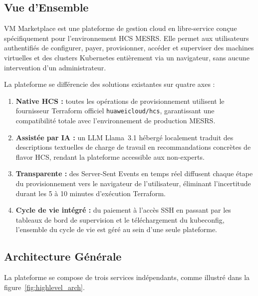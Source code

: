 \subsection{Vue d'Ensemble}

VM Marketplace est une plateforme de gestion cloud en libre-service conçue
spécifiquement pour l'environnement HCS MESRS. Elle permet aux utilisateurs
authentifiés de configurer, payer, provisionner, accéder et superviser des machines
virtuelles et des clusters Kubernetes entièrement via un navigateur, sans aucune
intervention d'un administrateur.

La plateforme se différencie des solutions existantes sur quatre axes :
\begin{enumerate}
  \item \textbf{Native HCS :} toutes les opérations de provisionnement utilisent le
        fournisseur Terraform officiel \texttt{huaweicloud/hcs}, garantissant une
        compatibilité totale avec l'environnement de production MESRS.
  \item \textbf{Assistée par IA :} un LLM Llama~3.1 hébergé localement traduit des
        descriptions textuelles de charge de travail en recommandations concrètes de
        flavor HCS, rendant la plateforme accessible aux non-experts.
  \item \textbf{Transparente :} des Server-Sent Events en temps réel diffusent chaque
        étape du provisionnement vers le navigateur de l'utilisateur, éliminant
        l'incertitude durant les 5 à 10 minutes d'exécution Terraform.
  \item \textbf{Cycle de vie intégré :} du paiement à l'accès SSH en passant par les
        tableaux de bord de supervision et le téléchargement du kubeconfig, l'ensemble
        du cycle de vie est géré au sein d'une seule plateforme.
\end{enumerate}

\subsection{Architecture Générale}

La plateforme se compose de trois services indépendants, comme illustré dans la
figure~\ref{fig:highlevel_arch}.

